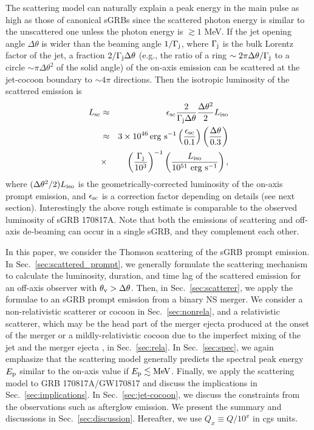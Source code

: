 \documentclass{emulateapj}
\begin{document}
The scattering model can naturally explain a peak energy in the main pulse 
as high as those of canonical sGRBs since the scattered photon energy is 
similar to the unscattered one
unless the photon energy is $\gtrsim1$ MeV. 
If the jet opening angle $\Delta\theta$ is wider than the beaming angle $1/\Gamma_{\rm j}$, 
where $\Gamma_{\rm j}$ is the bulk Lorentz factor of the jet, 
a fraction $2/\Gamma_{\rm j} \Delta\theta$ 
(e.g., the ratio of a ring $\sim 2\pi \Delta\theta/\Gamma_{\rm j}$
to a circle $\sim \pi \Delta\theta^2$ of the solid angle) 
of the on-axis emission
can be scattered at the jet-cocoon boundary to $\sim 4\pi$ directions.
Then the isotropic luminosity of the scattered emission is
\begin{eqnarray}\label{eq:order}
L_{\rm sc}&\approx&
\epsilon_{\rm sc}
\frac{2}{\Gamma_{\rm j}\Delta\theta}\frac{\Delta\theta^2}{2}L_{\rm iso} \nonumber \\
&\approx&3\times10^{46}\,{\rm erg~s}^{-1}
\left(\frac{\epsilon_{\rm sc}}{0.1}\right)
\left(\frac{\Delta\theta}{0.3}\right)
\nonumber\\&\times&
\left(\frac{\Gamma_{\rm j}}{10^3}\right)^{-1}
\left(\frac{L_{\rm iso}}{10^{51}~{\rm erg~s}^{-1}}\right),
\end{eqnarray}
where $(\Delta\theta^2/2)L_{\rm iso}$ is the geometrically-corrected luminosity 
of the on-axis prompt emission,
and $\epsilon_{\rm sc}$ is a correction factor depending on details
(see next section).
Interestingly the above rough estimate is comparable to 
the observed luminosity of sGRB 170817A.
Note that both the emissions of scattering and off-axis de-beaming can occur in a single sGRB,
and they complement each other.

In this paper, we consider the Thomson scattering of the sGRB prompt emission.
In Sec.~\ref{sec:scattered_prompt},
we generally formulate the scattering mechanism 
to calculate the luminosity, duration, and time lag
of the scattered emission for an off-axis observer with
$\theta_{\rm v}>\Delta\theta$.
Then, in Sec.~\ref{sec:scatterer}, 
we apply the formulae to an sGRB prompt emission from a binary NS merger.
We consider a non-relativistic scatterer or cocoon in Sec.~\ref{sec:nonrela},
and a relativistic scatterer, 
which may be 
the head part of the merger ejecta produced at the onset of the merger \citep{2014MNRAS.437L...6K}
or a mildly-relativistic cocoon 
due to the imperfect mixing of the jet and the merger ejecta \citep[e.g., ][]{2017ApJ...834...28N, 2018MNRAS.473..576G, 2017ApJ...848L...6L},
in Sec.~\ref{sec:rela}.
In Sec.~\ref{sec:spec},
we again emphasize that the scattering model generally predicts
the spectral peak energy $E_{\rm p}$ similar to the on-axis value
if $E_{\rm p} \lesssim {\rm MeV}$.
Finally, we apply the scattering model to GRB 170817A/GW170817 and discuss the implications in Sec.~\ref{sec:implications}. 
In Sec.~\ref{sec:jet-cocoon}, we discuss the constraints from the observations such as afterglow emission.
We present the summary and discussions in Sec.~\ref{sec:discussion}. 
Hereafter, we use $Q_x\equiv Q/10^x$ in cgs units. 
\end{document}

